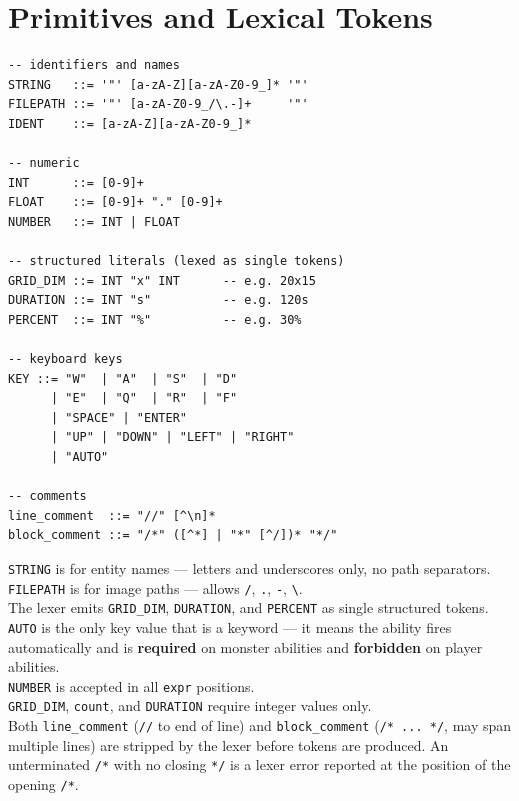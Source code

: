 \documentclass[12pt,a4paper]{article}
\begin{document}
\section{Primitives and Lexical Tokens}

\begin{lstlisting}[style=bnf]
-- identifiers and names
STRING   ::= '"' [a-zA-Z][a-zA-Z0-9_]* '"'
FILEPATH ::= '"' [a-zA-Z0-9_/\.-]+     '"'
IDENT    ::= [a-zA-Z][a-zA-Z0-9_]*

-- numeric
INT      ::= [0-9]+
FLOAT    ::= [0-9]+ "." [0-9]+
NUMBER   ::= INT | FLOAT

-- structured literals (lexed as single tokens)
GRID_DIM ::= INT "x" INT      -- e.g. 20x15
DURATION ::= INT "s"          -- e.g. 120s
PERCENT  ::= INT "%"          -- e.g. 30%

-- keyboard keys
KEY ::= "W"  | "A"  | "S"  | "D"
      | "E"  | "Q"  | "R"  | "F"
      | "SPACE" | "ENTER"
      | "UP" | "DOWN" | "LEFT" | "RIGHT"
      | "AUTO"

-- comments
line_comment  ::= "//" [^\n]*
block_comment ::= "/*" ([^*] | "*" [^/])* "*/"
\end{lstlisting}

\begin{cbox}
\texttt{STRING} is for entity names --- letters and underscores only, no path separators.\\
\texttt{FILEPATH} is for image paths --- allows \texttt{/}, \texttt{.}, \texttt{-}, \texttt{\textbackslash}.\\
The lexer emits \texttt{GRID\_DIM}, \texttt{DURATION}, and \texttt{PERCENT} as single structured tokens.\\
\texttt{AUTO} is the only key value that is a keyword --- it means the ability fires automatically and is \textbf{required} on monster abilities and \textbf{forbidden} on player abilities.\\
\texttt{NUMBER} is accepted in all \texttt{expr} positions.\\
\texttt{GRID\_DIM}, \texttt{count}, and \texttt{DURATION} require integer values only.\\
Both \texttt{line\_comment} (\texttt{//} to end of line) and \texttt{block\_comment}
(\texttt{/* ... */}, may span multiple lines) are stripped by the lexer before
tokens are produced. An unterminated \texttt{/*} with no closing \texttt{*/} is a
lexer error reported at the position of the opening \texttt{/*}.
\end{cbox}
\end{document}

